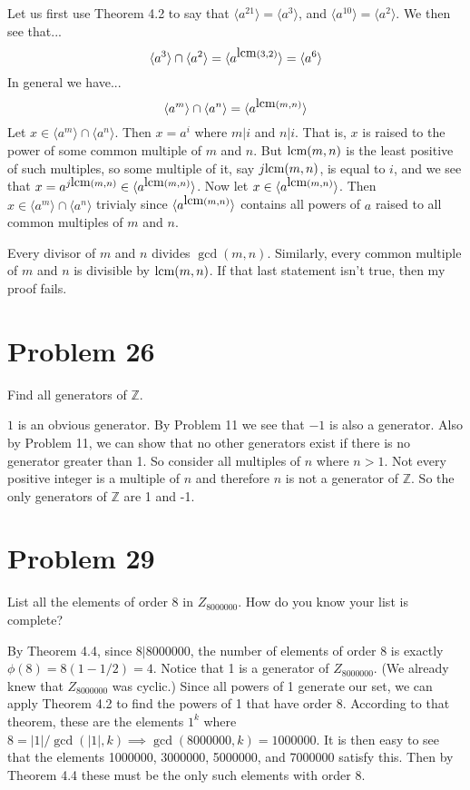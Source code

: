 \documentclass{article}
\begin{document}
Let us first use Theorem 4.2 to say that $\langle a^{21}\rangle=\langle a^3\rangle$,
and $\langle a^{10}\rangle=\langle a^2\rangle$.  We then see that...
\begin{equation*}
\langle a^3\rangle\cap\langle a^2\rangle = \langle a^{\mbox{lcm}(3,2)}\rangle = \langle a^6\rangle
\end{equation*}
In general we have...
\begin{equation*}
\langle a^m\rangle\cap\langle a^n\rangle=\langle a^{\mbox{lcm}(m,n)}\rangle
\end{equation*}
Let $x\in\langle a^m\rangle\cap\langle a^n\rangle$.  Then $x=a^{i}$
where $m|i$ and $n|i$.  That is, $x$ is raised to the power of some
common multiple of $m$ and $n$.  But $\mbox{lcm}(m,n)$ is the least positive of
such multiples, so some multiple of it, say $j\mbox{lcm}(m,n)$, is equal to $i$, and we
see that $x=a^{j\mbox{lcm}(m,n)}\in\langle a^{\mbox{lcm}(m,n)}\rangle$.
Now let $x\in\langle a^{\mbox{lcm}(m,n)}\rangle$.  Then $x\in\langle a^m\rangle\cap\langle a^n\rangle$
trivialy since $\langle a^{\mbox{lcm}(m,n)}\rangle$ contains all powers of $a$ raised to all
common multiples of $m$ and $n$.

Every divisor of $m$ and $n$ divides $\gcd(m,n)$.  Similarly, every
common multiple of $m$ and $n$ is divisible by $\mbox{lcm}(m,n)$.  If that
last statement isn't true, then my proof fails.

\section*{Problem 26}

Find all generators of $\mathbb{Z}$.

$1$ is an obvious generator.  By Problem 11 we see that $-1$ is also a generator.
Also by Problem 11, we can show that no other generators exist if there is no
generator greater than 1.  So consider all multiples of $n$ where $n>1$.
Not every positive integer is a multiple of $n$ and therefore $n$ is not a generator of
$\mathbb{Z}$.  So the only generators of $\mathbb{Z}$ are 1 and -1.

\section*{Problem 29}

List all the elements of order 8 in $Z_{8000000}$.  How do you know your list is complete?

By Theorem 4.4, since $8|8000000$, the
number of elements of order 8 is exactly $\phi(8)=8(1-1/2)=4$.
Notice that 1 is a generator of $Z_{8000000}$.  (We already knew that $Z_{8000000}$ was
cyclic.)  Since all powers of 1 generate
our set, we can apply Theorem 4.2 to find the powers of 1 that have order 8.
According to that theorem, these are the elements $1^k$ where
$8=|1|/\gcd(|1|,k)\implies\gcd(8000000,k)=1000000$.  It is then easy to see that
the elements 1000000, 3000000, 5000000, and 7000000 satisfy this.  Then by
Theorem 4.4 these must be the only such elements with order 8.
\end{document}

